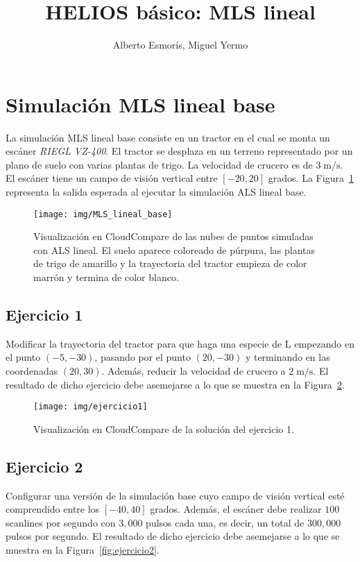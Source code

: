 \documentclass[]{article}
\title{HELIOS básico: MLS lineal}
\author{Alberto Esmorís, Miguel Yermo}
\date{}
\begin{document}
	
	\maketitle
	
	
	
	\section*{Simulación MLS lineal base}
	La simulación MLS lineal base consiste en un tractor en el cual se monta un escáner \textit{RIEGL VZ-400}. El tractor se desplaza en un terreno representado por un plano de suelo con varias plantas de trigo. La velocidad de crucero es de $3\;\text{m}/\text{s}$. El escáner tiene un campo de visión vertical entre $[-20, 20]$ grados. La Figura~\ref{fig:mls_lineal_base} representa la salida esperada al ejecutar la simulación ALS lineal base.
	
	\begin{figure}[htb]
		\centering
		\texttt{[image: img/MLS\_lineal\_base]}
		\caption{Visualización en CloudCompare de las nubes de puntos simuladas con ALS lineal. El suelo aparece coloreado de púrpura, las plantas de trigo de amarillo y la trayectoria del tractor empieza de color marrón y termina de color blanco.}
		\label{fig:mls_lineal_base}
	\end{figure}


	\pagebreak
	

	\subsection*{Ejercicio 1}
	Modificar la trayectoria del tractor para que haga una especie de L empezando en el punto $(-5, -30)$, pasando por el punto $(20, -30)$ y terminando en las coordenadas $(20, 30)$. Además, reducir la velocidad de crucero a $2\;\text{m}/\text{s}$. El resultado de dicho ejercicio debe asemejarse a lo que se muestra en la Figura~\ref{fig:ejercicio1}.
	
	\begin{figure}[htb]
		\centering
		\texttt{[image: img/ejercicio1]}
		\caption{Visualización en CloudCompare de la solución del ejercicio 1.}
		\label{fig:ejercicio1}
	\end{figure}


	\subsection*{Ejercicio 2}
	Configurar una versión de la simulación base cuyo campo de visión vertical esté comprendido entre los $[-40, 40]$ grados. Además, el escáner debe realizar $100$ scanlines por segundo con $3,000$ pulsos cada una, es decir, un total de $300,000$ pulsos por segundo. El resultado de dicho ejercicio debe asemejarse a lo que se muestra en la Figura~\ref{fig:ejercicio2}.
	
\end{document}

